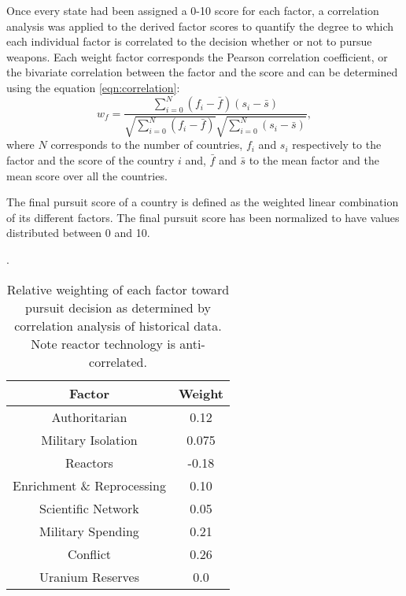 Once every state had been assigned a 0-10 score for each factor, a correlation
analysis was applied to the derived factor scores to quantify the degree to
which each individual factor is correlated to the decision whether or not to
pursue weapons. 
Each weight factor corresponds the Pearson correlation coefficient, or
the bivariate correlation between the factor and the score and can be
determined using the equation \ref{eqn:correlation}:
\begin{equation}
    \label{eqn:correlation}
    w_{f} = \frac{\sum_{i=0}^{N} (f_{i} - \bar{f}) (s_{i} - \bar{s})}
                 {\sqrt{\sum_{i=0}^{N}\left(f_{i} - \bar{f}\right)}
                 \sqrt{\sum_{i=0}^{N}\left(s_{i} - \bar{s}\right)}},
\end{equation}
where $N$ corresponds to the number of countries, $f_{i}$ and $s_{i}$ respectively
to the factor and the score of the country $i$ and, $\bar{f}$ and $\bar{s}$ to
the mean factor and the mean score over all the countries.

The final pursuit score  of a country is defined as the weighted linear combination of
its different factors. The final pursuit score has been normalized to have
values distributed between 0 and 10.

.  


\begin{table}
\centering
\begin{tabular}{|c|c|}
\hline
\textbf{Factor}        & \textbf{Weight} \\
\hline
Authoritarian   & 0.12 \\
Military Isolation & 0.075 \\
Reactors           & -0.18 \\
Enrichment \& Reprocessing & 0.10 \\
Scientific Network & 0.05 \\
Military Spending & 0.21 \\
Conflict  & 0.26 \\
Uranium Reserves &  0.0 \\
\hline
\end{tabular}
\caption{Relative weighting of each factor toward pursuit decision as determined by correlation analysis of historical data. Note reactor technology is anti-correlated.}
\label{tab:factor_weights}
\end{table}

